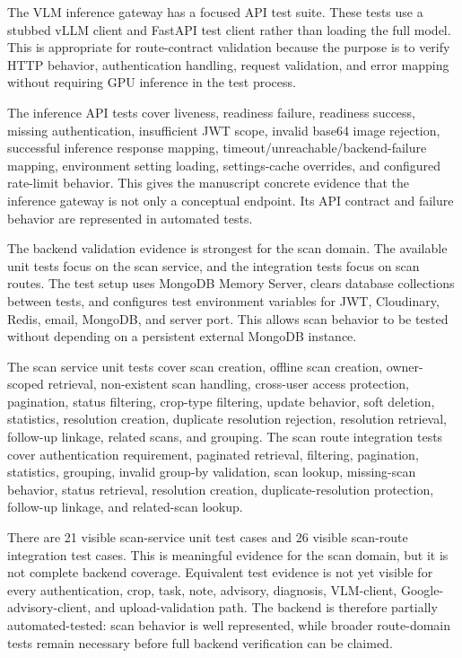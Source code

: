 
The VLM inference gateway has a focused API test suite. These tests use a stubbed vLLM client and
FastAPI test client rather than loading the full model. This is appropriate for route-contract
validation because the purpose is to verify HTTP behavior, authentication handling, request
validation, and error mapping without requiring GPU inference in the test process.

The inference API tests cover liveness, readiness failure, readiness success, missing
authentication, insufficient JWT scope, invalid base64 image rejection, successful inference
response mapping, timeout/unreachable/backend-failure mapping, environment setting loading,
settings-cache overrides, and configured rate-limit behavior. This gives the manuscript concrete
evidence that the inference gateway is not only a conceptual endpoint. Its API contract and
failure behavior are represented in automated tests.


The backend validation evidence is strongest for the scan domain. The available unit tests focus
on the scan service, and the integration tests focus on scan routes. The test setup uses
MongoDB Memory Server, clears database collections between tests, and configures test environment
variables for JWT, Cloudinary, Redis, email, MongoDB, and server port. This allows scan behavior
to be tested without depending on a persistent external MongoDB instance.

The scan service unit tests cover scan creation, offline scan creation, owner-scoped retrieval,
non-existent scan handling, cross-user access protection, pagination, status filtering,
crop-type filtering, update behavior, soft deletion, statistics, resolution creation, duplicate
resolution rejection, resolution retrieval, follow-up linkage, related scans, and grouping. The
scan route integration tests cover authentication requirement, paginated retrieval, filtering,
pagination, statistics, grouping, invalid group-by validation, scan lookup, missing-scan behavior,
status retrieval, resolution creation, duplicate-resolution protection, follow-up linkage, and
related-scan lookup.

There are 21 visible scan-service unit test cases and 26 visible scan-route integration test cases.
This is meaningful evidence for the scan domain, but it is not complete backend coverage.
Equivalent test evidence is not yet visible for every authentication, crop, task, note, advisory,
diagnosis, VLM-client, Google-advisory-client, and upload-validation path. The backend is
therefore partially automated-tested: scan behavior is well represented, while broader
route-domain tests remain necessary before full backend verification can be claimed.

